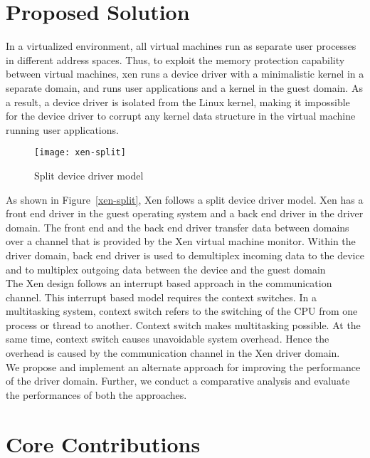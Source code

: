 \pagebreak
  
\section {Proposed Solution} 

In a virtualized environment, all virtual machines run as separate user processes in different address spaces. Thus, to exploit the memory protection capability between virtual machines, xen runs a device driver with a minimalistic kernel in a separate domain, and runs user applications and a kernel in the guest domain. As a result, a device driver is isolated from the Linux kernel, making it impossible for the device driver to corrupt any kernel data structure in the virtual machine running user applications. 

\begin{figure}[!ht]
\centering
\texttt{[image: xen-split]}
\caption{Split device driver model}
\label{fig:xen-split}
\end{figure}

As shown in Figure~\ref{xen-split}, Xen follows a split device driver model. Xen has a front end driver in the guest operating system and a back end driver in the driver domain. The front end and the back end driver transfer data between domains over a channel that is provided by the Xen virtual machine monitor. Within the driver domain, back end driver is used to demultiplex incoming data to the device and to multiplex outgoing data between the device and the guest domain\cite{driverdomain}
\\
The Xen design follows an interrupt based approach in the communication channel\cite{Barham:2003:XAV:945445.945462}. This interrupt based model requires the context switches\cite{Barham:2003:XAV:945445.945462}. In a multitasking system, context switch refers to the switching of the CPU from one process or thread to another. Context switch makes multitasking possible. At the same time, context switch causes unavoidable system overhead\cite{Li:2007:QCC:1281700.1281702, Mogul:1991:ECS:106973.106982}. Hence the overhead is caused by the communication channel in the Xen driver domain. 
\\
We propose and implement an alternate approach for improving the performance of the driver domain. Further, we conduct a comparative analysis and evaluate the performances of both the approaches. 

\pagebreak

\section{Core Contributions}

